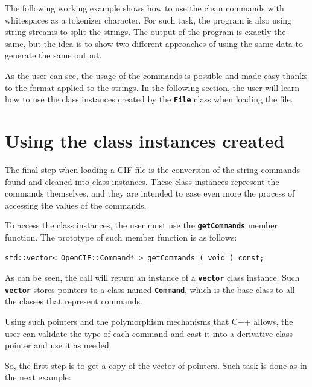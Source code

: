 \documentclass[11pt,twoside,openany,x11names,svgnames]{memoir}
\begin{document}
The following working example shows how to use the clean commands with whitespaces as a tokenizer character. For such task, the program is also using string streams to split the strings. The output of the program is exactly the same, but the idea is to show two different approaches of using the same data to generate the same output.



As the user can see, the usage of the commands is possible and made easy thanks to the format applied to the strings. In the following section, the user will learn how to use the class instances created by the \textbf{\texttt{File}} class when loading the file.

\section{Using the class instances created}\label{Using-the-class-instances-created}

The final step when loading a CIF file is the conversion of the string commands found and cleaned into class instances. These class instances represent the commands themselves, and they are intended to ease even more the process of accessing the values of the commands.

To access the class instances, the user must use the \textbf{\texttt{getCommands}} member function. The prototype of such member function is as follows:

\begin{lstlisting}[frame=single,style=CPPStyle]
std::vector< OpenCIF::Command* > getCommands ( void ) const;
\end{lstlisting}

As can be seen, the call will return an instance of a \textbf{\texttt{vector}} class instance. Such \textbf{\texttt{vector}} stores pointers to a class named \textbf{\texttt{Command}}, which is the base class to all the classes that represent commands.

Using such pointers and the polymorphism mechanisms that C++ allows, the user can validate the type of each command and cast it into a derivative class pointer and use it as needed.

So, the first step is to get a copy of the vector of pointers. Such task is done as in the next example:
\end{document}
